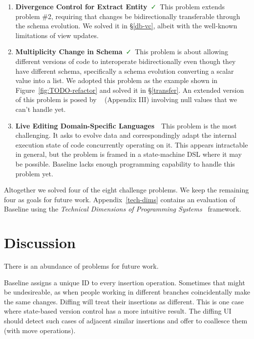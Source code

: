 \documentclass[english,submission]{programming}
\theoremstyle{definition}
\newcommand{\redCross}{\textcolor{red}{\ \faTimes\ }}
\newcommand{\greenCheck}{\textcolor{ForestGreen}{\ \faCheck\ }}
\newcommand{\citet}[1]{\citeauthor*{#1}~\cite{#1}}
\begin{document}
\begin{enumerate}
  \item \textbf{Divergence Control for Extract Entity}\greenCheck This problem extends problem \#2, requiring that changes be bidirectionally transferable through the schema evolution. We solved it in \S\ref{db-vc}, albeit with the well-known limitations of view updates.

  \item \textbf{Multiplicity Change in Schema}\greenCheck This problem is about allowing different versions of code to interoperate bidirectionally even though they have different schema, specifically a schema evolution converting a scalar value into a list. We adopted this problem as the example shown in Figure~\ref{fig:TODO-refactor} and solved it in \S\ref{transfer}. An extended version of this problem is posed by \citet{Cambria} (Appendix III) involving null values that we can't handle yet.

  \item \textbf{Live Editing Domain-Specific Languages}\redCross This problem is the most challenging. It asks to evolve data and correspondingly adapt the internal execution state of code concurrently operating on it. This appears intractable in general, but the problem is framed in a state-machine DSL where it may be possible. Baseline lacks enough programming capability to handle this problem yet.

\end{enumerate}

Altogether we solved four of the eight challenge problems. We keep the remaining four as goals for future work. Appendix~\ref{tech-dims} contains an evaluation of Baseline using the \textit{Technical Dimensions of Programming Systems}~\cite{techdims} framework.



\section{Discussion}\label{discussion}

There is an abundance of problems for future work.

Baseline assigns a unique ID to every insertion operation. Sometimes that might be undesireable, as when people working in different branches coincidentally make the same changes. Diffing will treat their insertions as different. This is one case where state-based version control has a more intuitive result.
The diffing UI should detect such cases of adjacent similar insertions and offer to coallesce them (with \textsf{move} operations).
\end{document}
